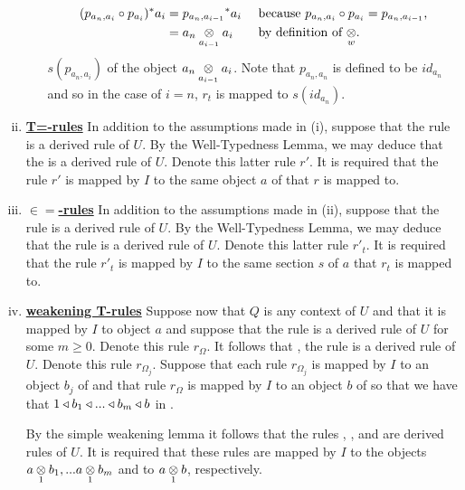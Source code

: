 \begin{definition}
\begin{enumerate}[(i)]
\begin{enumerate}[(a)]
{\begin{align*}
(p_{a_n,a_i} \circ p_{a_i})^*a_i &= {p_{a_n,a_{i-1}}} ^* a_i  && \mbox{ because $p_{a_n,a_i} \circ p_{a_i}=p_{a_n,a_{i-1}}$,} \\
                                 &= \crossx{a_n}{a_i}{a_{i-1}} && \mbox{ by definition of $\crossx{}{}{w}$}.
\end{align*}
} %
$s(p_{a_n,a_i})$ of the object $\crossx{a_n}{a_i}{a_{i-1}}$. Note that $p_{a_n,a_n}$ is defined to be $id_{a_n}$ and so in the case of $i=n$, $r_t$
is mapped to   $s(id_{a_n})$.
\end{enumerate}
\item \underline{\textbf{T=-rules}} 
In addition to the assumptions made in (i), suppose that  
the rule  is a derived rule of $U$. 
By the Well-Typedness Lemma, we may deduce that the
 is a derived rule of $U$. Denote this latter rule $r'$.
It is required that the rule $r'$ is mapped by $I$ to the same object $a$ of \catcw that $r$ is mapped to.

\item \underline{\textbf{$\boldsymbol{\in=}$-rules}} 
In addition to the assumptions made in (ii),  suppose that the rule
is a derived rule of $U$. 
By the Well-Typedness Lemma, we may deduce that the rule
 is a  derived rule of $U$. 
Denote this latter rule $r'_t$.
It is required that the rule $r'_t$ is mapped by $I$ to the same section $s$ of $a$ that $r_t$ is mapped to.

\item \underline{\textbf{weakening T-rules}} 
Suppose now that $Q$ is any context of $U$ and that it is mapped by $I$ to object $a$ and suppose that the rule 
 is a derived rule of $U$ for some $m \geq 0$. Denote this rule $r_\Omega$. 
It follows that \foreachj, the rule    is a derived rule of $U$. Denote this rule $r_{\Omega_j}$.
Suppose that each rule $r_{\Omega_j}$ is mapped by $I$ to an object $b_j$ of \catcw and that rule $r_\Omega$ is mapped by $I$ to an object $b$ of \catcw so that
we have that $1 \base b_1 \base ... \base b_m \base b$ in \catc.

By the simple weakening lemma it follows that the rules
 \kern-6pt, \foreachj, and 
 are  derived rules of $U$. It is required that these rules are mapped by $I$ to the objects
$\crossx{a}{b_1}{1},...\crossx{a}{b_m}{1}$ and to $\crossx{a}{b}{1}$, respectively. 


\end{enumerate}
\end{definition}
